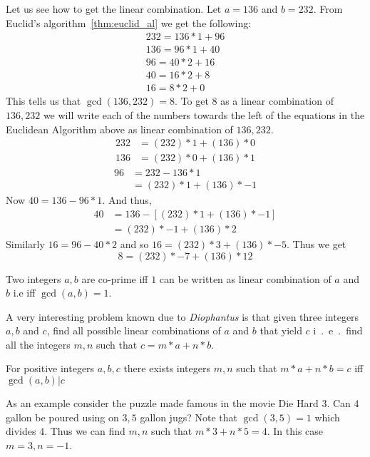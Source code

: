 Let us see how to get the linear combination. Let $a = 136$ and $b = 232$. From Euclid's
algorithm~\eqref{thm:euclid_al} we get the following:
\begin{align*}
    232 = 136*1 + 96 \\
    136 = 96*1 + 40 \\
    96 = 40*2 + 16 \\
    40 = 16*2 + 8 \\
    16 = 8*2 + 0
\end{align*}
This tells us that $\gcd(136,232) = 8$. To get $8$ as a linear combination of $136,232$ we will
write each of the numbers towards the left of the equations in the Euclidean Algorithm above as
linear combination of $136,232$. 
\begin{align*}
    232 &= (232)*1 + (136)*0 \\
    136 &= (232)*0 + (136)*1 
\end{align*}
\begin{align*}
    96 &= 232 - 136*1 \\ 
       &= (232)*1 + (136)*-1 
\end{align*}
Now $40 = 136 - 96*1$. And thus,
\begin{align*}
    40 &= 136 - \left[ (232)*1 + (136)*-1  \right] \\
       &= (232)*-1 + (136)*2 
\end{align*}
Similarly $16 = 96 - 40*2$ and so 
$16 = (232)*3 + (136)*-5 $. Thus we get 
\begin{equation*}
    8 = (232)*-7 + (136)*12
\end{equation*}

\begin{Definition}
    Two integers $a,b$ are co-prime iff $1$ can be written as linear combination of $a$ and $b$ i.e
    iff $\gcd(a,b) = 1$.
\end{Definition}

A very interesting problem known due to \emph{Diophantus} is that given three integers $a,b$
and $c$, find all possible  linear combinations of $a$ and $b$ that yield $c$ i~.~e~.~find all the
integers $m,n$ such that $c = m*a + n*b$.

\begin{Theorem}
    For positive integers $a,b,c$ there exists integers $m,n$ such that $m*a + n*b = c$ iff
    $\gcd(a,b) | c $
\label{thm:dioph}
\end{Theorem}

As an example consider the puzzle made famous in the movie Die Hard 3. Can $4$ gallon be poured
using on $3,5$ gallon jugs? Note that $\gcd(3,5) = 1$ which divides $4$. Thus we can find $m,n$ such
that $m*3 + n*5 = 4$. In this case $m = 3, n = -1$.

